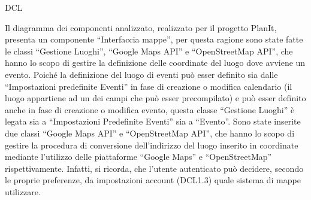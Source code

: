 \begin{listaPersonale}{DCL}
\begin{listaPersonale2}[DCL]{}

        Il diagramma dei componenti analizzato, realizzato per il progetto PlanIt, presenta un componente “Interfaccia mappe”, per questa ragione sono state fatte le classi “Gestione Luoghi”, “Google Maps API” e “OpenStreetMap API”, che hanno lo scopo di gestire la definizione delle coordinate del luogo dove avviene un evento. Poiché la definizione del luogo di eventi può esser definito sia dalle “Impostazioni predefinite Eventi” in fase di creazione o modifica calendario (il luogo appartiene ad un dei campi che può esser precompilato) e può esser definito anche in fase di creazione o modifica evento, questa classe “Gestione Luoghi” è legata sia a “Impostazioni Predefinite Eventi” sia a “Evento”.
        Sono state inserite due classi “Google Maps API” e “OpenStreetMap API”, che hanno lo scopo di gestire la procedura di conversione dell'indirizzo del luogo inserito in coordinate mediante l'utilizzo delle piattaforme “Google Maps” e “OpenStreetMap” rispettivamente. Infatti, si ricorda, che l'utente autenticato può decidere, secondo le proprie preferenze, da impostazioni account (DCL1.3) quale sistema di mappe utilizzare.
        \begin{comment}
            \begin{center}
                \\
                \blfootnote{Immagine \href{https://github.com/Life-planner/Documentazione/blob/main/D3/img/Diagrammi/png/path/to/img.png}{PNG}/\href{https://github.com/Life-planner/Documentazione/blob/main/D3/img/Diagrammi/svg/path/to/img.svg}{SVG} nome file}
            \end{center}
        \end{comment}




\end{listaPersonale2}
\end{listaPersonale}
